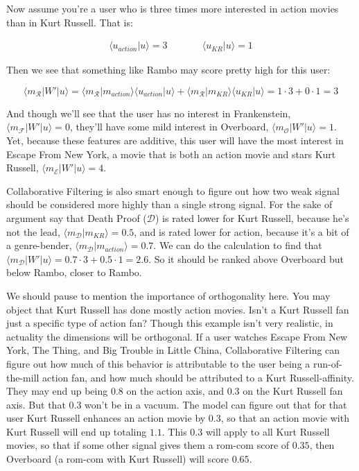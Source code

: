 \documentclass{amsbook}
\begin{document}
Now assume you're a user who is three times more interested in action movies than in Kurt Russell.  That is:

$$
\begin{array}{lll}
\langle u_{action}|u\rangle=3&\quad\quad&\langle u_{KR}|u\rangle=1
\end{array}
$$

Then we see that something like Rambo may score pretty high for this user:

$$
\langle m_{\mathcal R}|W'|u\rangle = \langle m_{\mathcal R}|m_{action}\rangle\langle u_{action}|u\rangle + \langle m_{\mathcal R}|m_{KR}\rangle\langle u_{KR}|u\rangle = 1\cdot 3 + 0\cdot 1 = 3
$$

And though we'll see that the user has no interest in Frankenstein, $\langle m_{\mathcal F}|W'|u\rangle=0$, they'll have some mild interest in Overboard, $\langle m_{\mathcal O}|W'|u\rangle=1$.  Yet, because these features are additive, this user will have the most interest in Escape From New York, a movie that is both an action movie and stars Kurt Russell, $\langle m_{\mathcal E}|W'|u\rangle=4$.

Collaborative Filtering is also smart enough to figure out how two weak signal should be considered more highly than a single strong signal.  For the sake of argument say that Death Proof ($\mathcal D$) is rated lower for Kurt Russell, because he's not the lead, $\langle m_{\mathcal D}|m_{KR}\rangle = 0.5$, and is rated lower for action, because it's a bit of a genre-bender, $\langle m_{\mathcal D}|m_{action}\rangle = 0.7$.  We can do the calculation to find that $\langle m_{\mathcal D}|W'|u\rangle = 0.7\cdot 3+0.5\cdot 1 = 2.6$.  So it should be ranked above Overboard but below Rambo, closer to Rambo.

We should pause to mention the importance of orthogonality here.  You may object that Kurt Russell has done mostly action movies.  Isn't a Kurt Russell fan just a specific type of action fan?  Though this example isn't very realistic, in actuality the dimensions will be orthogonal.  If a user watches Escape From New York, The Thing, and Big Trouble in Little China, Collaborative Filtering can figure out how much of this behavior is attributable to the user being a run-of-the-mill action fan, and how much should be attributed to a Kurt Russell-affinity.  They may end up being $0.8$ on the action axis, and $0.3$ on the Kurt Russell fan axis.  But that $0.3$ won't be in a vacuum.  The model can figure out that for that user Kurt Russell enhances an action movie by $0.3$, so that an action movie with Kurt Russell will end up totaling $1.1$.  This $0.3$ will apply to all Kurt Russell movies, so that if some other signal gives them a rom-com score of $0.35$, then Overboard (a rom-com with Kurt Russell) will score $0.65$.
\end{document}

